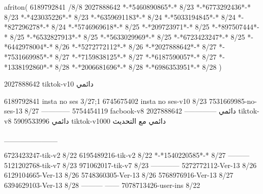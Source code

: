 afriton(
6189792841 /8/8
2027888642
*-*5460890865*-* 8/23
*-*6773292436*-* 8/23
*-*423035226*-* 8/23
*-*6359691183*-* 8/24
*-*5033194845*-* 8/24
*-*827296278*-* 8/24
*-*5746969618*-* 8/25
*-*209723971*-* 8/25
*-*897507444*-* 8/25
*-*6532827913*-* 8/25
*-*5633029969*-* 8/25
*-*6723423247*-* 8/25
*-*6442978004*-* 8/26
*-*5272772112*-* 8/26
*-*2027888642*-* 8/27
*-*7531669985*-* 8/27
*-*7159838125*-* 8/27
*-*6187590057*-* 8/27
*-*1338192860*-* 8/28
*-*2006681696*-* 8/28
*-*6986353951*-* 8/28
)

2027888642 tiktok-v10
دائمي

6189792841 insta no ses
3/27;1
6745675402 insta no ses-v10
8/23
7531669985-no-ses-13
8/27
------------
5754454119 facbook-v8
دائمي
--------------
2027888642 tiktok-v8
دائمي
5909533996 tiktok-v1000
دائمي مع التحديث

__________

6723423247-tik-v2
8/22
6195489216-tik-v2
8/22
*-*1540220585*-* 8/27
---------
5121202768-tik-v7
8/23
971062017-tik-v7
8/23
------------
5272772112-Ver-13
8/26
6129104665-Ver-13
8/26
5748360305-Ver-13
8/26
5768976916-Ver-13
8/27
6394629103-Ver-13
8/28
---------
------
7078713426-user-ins
8/22
